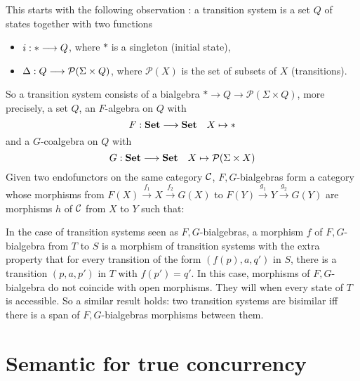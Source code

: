 		 This starts with the following observation \cite{jacobs16}: a transition system is a set $Q$ of states together with two functions
		 \begin{itemize}
		 	\item $i : \ast \longrightarrow Q$, where $\ast$ is a singleton (initial state),
			\item $\Delta : Q \longrightarrow \mathcal{P}(\Sigma\times Q)$, where $\mathcal{P}(X)$ is the set of subsets of $X$ (transitions).
		\end{itemize}
		So a transition system consists of a bialgebra $\ast \rightarrow Q \rightarrow \mathcal{P}(\Sigma\times Q)$, more precisely, a set $Q$, an $F$-algebra on $Q$ with 
		$$F : \textbf{Set} \longrightarrow \textbf{Set} ~~~ X \mapsto \ast$$
		and a $G$-coalgebra on $Q$ with
		$$G : \textbf{Set} \longrightarrow \textbf{Set} ~~~ X \mapsto \mathcal{P}(\Sigma\times X)$$
		Given two endofunctors on the same category $\mathcal{C}$, $F,G$-bialgebras form a category whose morphisms from $F(X) \xrightarrow{~f_1~} X \xrightarrow{~f_2~} G(X)$ to $F(Y) \xrightarrow{~g_1~} Y \xrightarrow{~g_2~} G(Y)$ are morphisms $h$ of $\mathcal{C}$ from $X$ to $Y$ such that:
		
		\begin{figure}[H]
			\begin{center}
    				
  			\end{center}
		\end{figure}
		
		In the case of transition systems seen as $F,G$-bialgebras, a morphism $f$ of $F,G$-bialgebra from $T$ to $S$ is a morphism of transition systems with the extra property that for every transition of the form $(f(p),a,q')$ in $S$, there is a transition $(p,a,p')$ in $T$ with $f(p') = q'$. In this case, morphisms of $F,G$-bialgebra do not coincide with open morphisms. They will when every state of $T$ is accessible. So a similar result holds: two transition systems are bisimilar iff there is a span of $F,G$-bialgebras morphisms between them. 
		
		\begin{figure}[H]
			\begin{center}
    				
  			\end{center}
		\end{figure}
		
		 
		 




\section{Semantic for true concurrency}
\label{sec:semtc}


